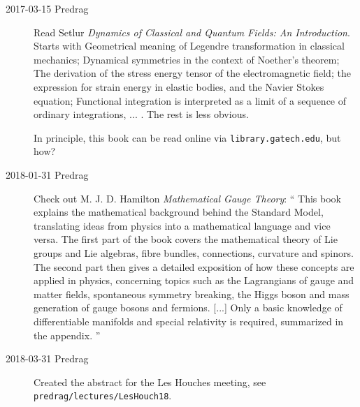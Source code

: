 \begin{description}
\item[2017-03-15 Predrag] Read
Setlur
{\em Dynamics of Classical and Quantum Fields: An Introduction}.
Starts with
Geometrical meaning of Legendre transformation in classical mechanics;
Dynamical symmetries in the context of Noether’s theorem;
The derivation of the stress energy tensor of the electromagnetic field;
the expression for strain energy in elastic bodies, and the Navier Stokes
equation;
Functional integration is interpreted as a limit of a sequence of
ordinary integrations, ... .
The rest is less obvious.

In principle, this book can be read online via
\texttt{library.gatech.edu}, but how?

\item[2018-01-31 Predrag] Check out
M. J. D. Hamilton
{\em Mathematical Gauge Theory}: ``
This book explains the mathematical background behind the Standard Model,
translating ideas from physics into a mathematical language and vice versa.
The first part of the book covers the mathematical theory of Lie groups and
Lie algebras, fibre bundles, connections, curvature and spinors. The second
part then gives a detailed exposition of how these concepts are applied in
physics, concerning topics such as the Lagrangians of gauge and matter
fields, spontaneous symmetry breaking, the Higgs boson and mass generation of
gauge bosons and fermions.
[...] Only a basic knowledge of differentiable manifolds and special
relativity is required, summarized in the appendix.
''

\item[2018-03-31 Predrag] Created the abstract for the Les Houches meeting, see
\texttt{predrag/lectures/LesHouch18}.

\end{description}


\printbibliography[heading=subbibintoc,title={References}]
